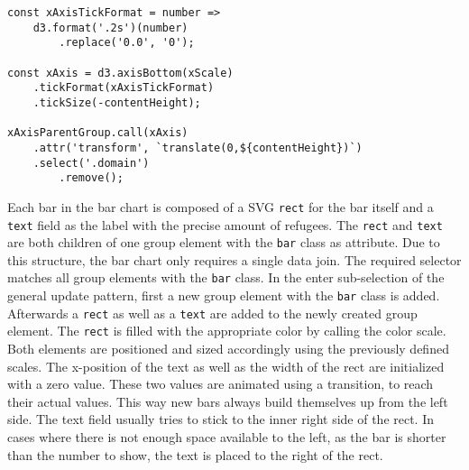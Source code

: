 \begin{minipage}{0.9\linewidth}
    \begin{lstlisting}[style=htmlCSSjs, captionpos=b, caption={The x axis implementation of the bar chart. The first constant defines the tick format. The provided '.2s' means that each number will be convert to have two significant digits. As the zero value is therefore represented as "0.0" to match the previous rule of two significant digits, it is simply replaced by "0". The second constant defines the function creating the axis. The previous tick format is passed here. Furthermore the \texttt{tickSize} is set to the height of the diagram. This way the initially small tick lines now cover the whole height of the diagram and allow for easier and more accurate readouts. Finally the \texttt{xAxisParentGroup} element, which is part of the permantent hierarchical structure of the bar chart, calls the \texttt{xAxis} function. This adds the Axis to the diagram. As a last step the domain lines are selected and removed for styling reasons. (Section from \ref{app:bar-chart} lines 91ff)}, label={lst:bar-chart-axes}]
const xAxisTickFormat = number =>
    d3.format('.2s')(number)
        .replace('0.0', '0');

const xAxis = d3.axisBottom(xScale)
    .tickFormat(xAxisTickFormat)
    .tickSize(-contentHeight);

xAxisParentGroup.call(xAxis)
    .attr('transform', `translate(0,${contentHeight})`)
    .select('.domain')
        .remove();
    \end{lstlisting}
\end{minipage}

Each bar in the bar chart is composed of a SVG \texttt{rect} for the bar itself and a \texttt{text} field as the label with the precise amount of refugees. The \texttt{rect} and \texttt{text} are both children of one group element with the \texttt{bar} class as attribute. Due to this structure, the bar chart only requires a single data join. The required selector matches all group elements with the \texttt{bar} class. In the enter sub-selection of the general update pattern, first a new group element with the \texttt{bar} class is added. Afterwards a \texttt{rect} as well as a \texttt{text} are added to the newly created group element. The \texttt{rect} is filled with the appropriate color by calling the color scale. Both elements are positioned and sized accordingly using the previously defined scales. The x-position of the text as well as the width of the rect are initialized with a zero value. These two values are animated using a transition, to reach their actual values. This way new bars always build themselves up from the left side. The text field usually tries to stick to the inner right side of the rect. In cases where there is not enough space available to the left, as the bar is shorter than the number to show, the text is placed to the right of the rect.

